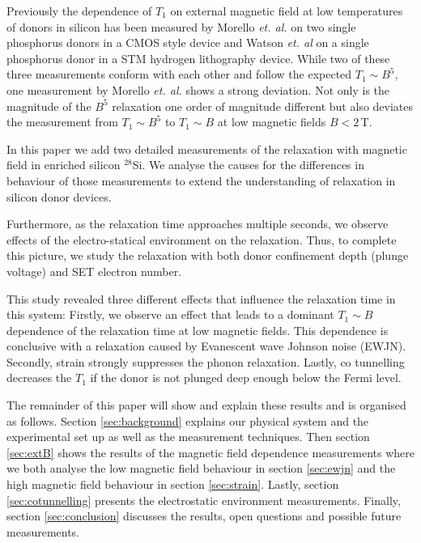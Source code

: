 \documentclass[%
 reprint,
 amsmath,amssymb,
 aps,
]{revtex4-1}
\newcommand {\ket} [1] {|{ #1 \rangle}}
\begin{document}
Previously the dependence of $T_1$ on external magnetic field at low temperatures of donors in silicon has been measured by Morello \textit{et. al.} \cite{Morello2010} on two single phosphorus donors in a CMOS style device and Watson \textit{et. al} \cite{Watson2015} on a single phosphorus donor in a STM hydrogen lithography device. While two of these three measurements conform with each other and follow the expected $T_1\sim B^5$, one measurement by Morello \textit{et. al.} shows a strong deviation. Not only is the magnitude of the $B^5$ relaxation one order of magnitude different but also deviates the measurement from $T_1\sim B^5$ to $T_1\sim B$ at low magnetic fields $B<2\,$T.  

In this paper we add two detailed measurements of the relaxation with magnetic field in enriched silicon $^{28}$Si. We analyse the causes for the differences in behaviour of those measurements to extend the understanding of relaxation in silicon donor devices. 

Furthermore, as the relaxation time approaches multiple seconds, we observe effects of the electro-statical environment on the relaxation. Thus, to complete this picture, we study the relaxation with both donor confinement depth (plunge voltage) and SET electron number. 

This study revealed three different effects that influence the relaxation time in this system:  Firstly, we observe an effect that leads to a dominant $T_1\sim B$ dependence of the relaxation time at low magnetic fields. This dependence is conclusive with a relaxation caused by Evanescent wave Johnson noise (EWJN).
 Secondly, strain strongly suppresses the phonon relaxation. Lastly, co tunnelling decreases the $T_1$ if the donor is not plunged deep enough below the Fermi level.

The remainder of this paper will show and explain these results and is organised as follows. Section \ref{sec:background} explains our physical system and the experimental set up as well as the measurement techniques. Then section \ref{sec:extB} shows the results of the magnetic field dependence measurements where we both analyse the low magnetic field behaviour in section \ref{sec:ewjn} and the high magnetic field behaviour in section \ref{sec:strain}. Lastly, section \ref{sec:cotunnelling} presents the electrostatic environment measurements. Finally, section \ref{sec:conclusion} discusses the results, open questions and possible future measurements. 
\end{document}
